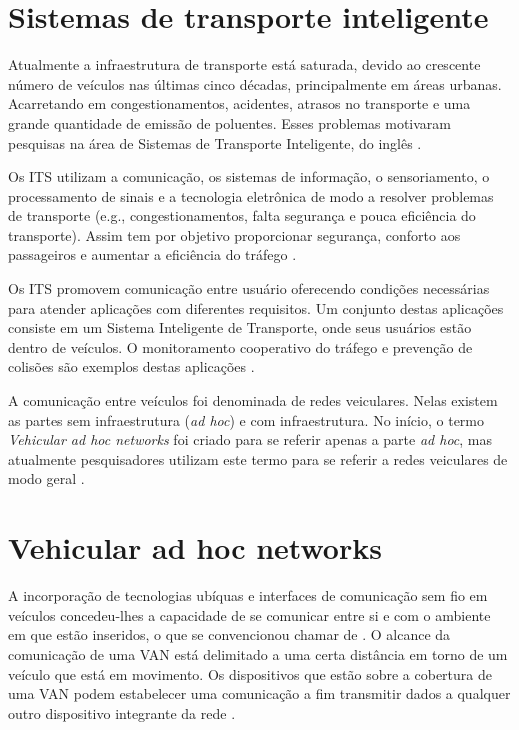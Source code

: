 \documentclass[mestrado, pre-defesa, english, brazil]{packages/icmc}
\begin{document}
\section{Sistemas de transporte inteligente} \label{its}

Atualmente a infraestrutura de transporte está saturada, devido ao crescente número de veículos nas últimas cinco décadas, principalmente em áreas urbanas. Acarretando em congestionamentos, acidentes, atrasos no transporte e uma grande quantidade de emissão de poluentes. Esses problemas motivaram pesquisas na área de Sistemas de Transporte Inteligente, do inglês  \cite{Figueiredo-2004}.

Os ITS utilizam a comunicação, os sistemas de informação, o sensoriamento, o processamento de sinais e a tecnologia eletrônica de modo a resolver problemas de transporte (e.g., congestionamentos, falta segurança e pouca eficiência do transporte). Assim tem por objetivo proporcionar segurança, conforto aos passageiros e aumentar a eficiência do tráfego \cite{Figueiredo-2001}.

Os ITS promovem comunicação entre usuário oferecendo condições necessárias para atender aplicações com diferentes requisitos. Um conjunto destas aplicações consiste em um Sistema Inteligente de Transporte, onde seus usuários estão dentro de veículos. O monitoramento cooperativo do tráfego e prevenção de colisões são exemplos destas aplicações \cite{Alves-2009}.

A comunicação entre veículos foi denominada de redes veiculares. Nelas existem as partes sem infraestrutura (\textit{ad hoc}) e com infraestrutura. No início, o termo \textit{Vehicular ad hoc networks} foi criado para se referir apenas a parte \textit{ad hoc}, mas atualmente pesquisadores utilizam este termo para se referir a redes veiculares de modo geral \cite{Yokoyama-2014,Alves-2009,junior-2013}.

\section{Vehicular ad hoc networks} \label{VANETs}

A incorporação de tecnologias ubíquas e interfaces de comunicação sem fio em veículos concedeu-lhes a capacidade de se comunicar entre si e com o ambiente em que estão inseridos, o que se convencionou chamar de . O alcance da comunicação de uma VAN está delimitado a uma certa distância em torno de um veículo que está em movimento. Os dispositivos que estão sobre a cobertura de uma VAN podem estabelecer uma comunicação a fim transmitir dados a qualquer outro dispositivo integrante da rede \cite{Faezipour-2012}.
\end{document}
